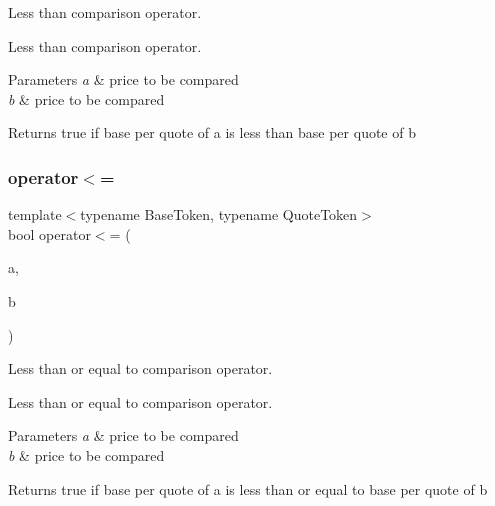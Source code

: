 Less than comparison operator. 

Less than comparison operator. 
\begin{DoxyParams}{Parameters}
{\em a} & price to be compared \\
\hline
{\em b} & price to be compared \\
\hline
\end{DoxyParams}
\begin{DoxyReturn}{Returns}
true if base per quote of a is less than base per quote of b 
\end{DoxyReturn}
\mbox{\label{structaacio_1_1price_a9a92923bb6a379671facc88b8f33e1f8}} 
\subsubsection{\texorpdfstring{operator$<$=}{operator<=}}
{\footnotesize\ttfamily template$<$typename Base\+Token, typename Quote\+Token$>$ \\
bool operator$<$= (\begin{DoxyParamCaption}\item[{const \mbox{\hyperlink{structaacio_1_1price}{price}}$<$ Base\+Token, Quote\+Token $>$ \&}]{a,  }\item[{const \mbox{\hyperlink{structaacio_1_1price}{price}}$<$ Base\+Token, Quote\+Token $>$ \&}]{b }\end{DoxyParamCaption})\hspace{0.3cm}{\ttfamily [friend]}}



Less than or equal to comparison operator. 

Less than or equal to comparison operator. 
\begin{DoxyParams}{Parameters}
{\em a} & price to be compared \\
\hline
{\em b} & price to be compared \\
\hline
\end{DoxyParams}
\begin{DoxyReturn}{Returns}
true if base per quote of a is less than or equal to base per quote of b 
\end{DoxyReturn}
\mbox{\label{structaacio_1_1price_a64a97e029f909397f7e93ae9f18c0f92}} 
